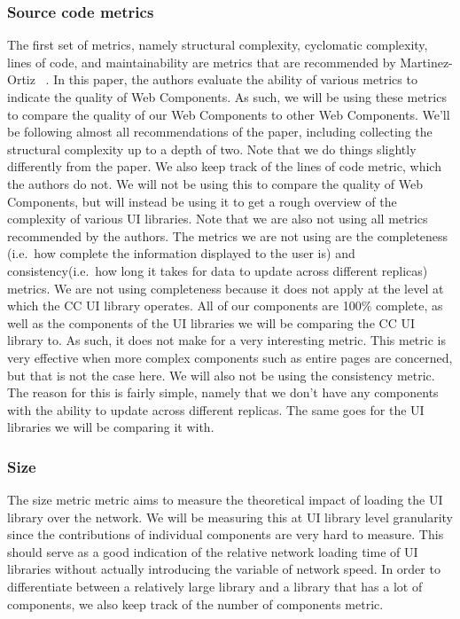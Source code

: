 \subsubsection{Source code metrics}
The first set of metrics, namely structural complexity, cyclomatic complexity, lines of code, and maintainability are metrics that are recommended by Martinez-Ortiz \etal{}~\cite{martinez-ortiz2016quality}. In this paper, the authors evaluate the ability of various metrics to indicate the quality of Web Components. As such, we will be using these metrics to compare the quality of our Web Components to other Web Components. We'll be following almost all recommendations of the paper, including collecting the structural complexity up to a depth of two. Note that we do things slightly differently from the paper. We also keep track of the lines of code metric, which the authors do not. We will not be using this to compare the quality of Web Components, but will instead be using it to get a rough overview of the complexity of various UI libraries. Note that we are also not using all metrics recommended by the authors. The metrics we are not using are the completeness (i.e.~how complete the information displayed to the user is) and consistency(i.e.~how long it takes for data to update across different replicas) metrics. We are not using completeness because it does not apply at the level at which the CC UI library operates. All of our components are 100\% complete, as well as the components of the UI libraries we will be comparing the CC UI library to. As such, it does not make for a very interesting metric. This metric is very effective when more complex components such as entire pages are concerned, but that is not the case here. We will also not be using the consistency metric. The reason for this is fairly simple, namely that we don't have any components with the ability to update across different replicas. The same goes for the UI libraries we will be comparing it with.

\subsubsection{Size}
The size metric metric aims to measure the theoretical impact of loading the UI library over the network. We will be measuring this at UI library level granularity since the contributions of individual components are very hard to measure. This should serve as a good indication of the relative network loading time of UI libraries without actually introducing the variable of network speed. In order to differentiate between a relatively large library and a library that has a lot of components, we also keep track of the number of components metric.

